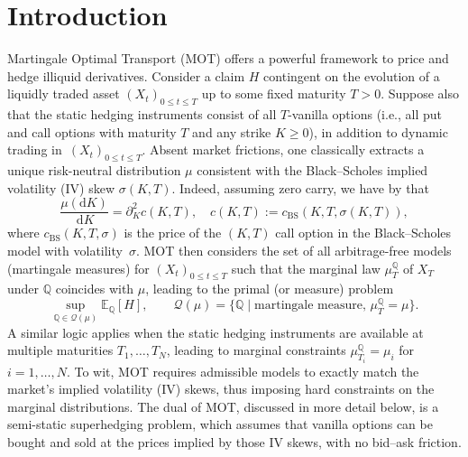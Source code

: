 \documentclass[11pt]{article}
\newcommand{\cQ}{\mathcal{Q}}
\newcommand{\Q}{\mathbb{Q}} %
\theoremstyle{plain}
\theoremstyle{definition}
\theoremstyle{remark}
\newcommand{\E}{\mathbb{E}}
\newcommand*{\rd}{\mathrm{d}}
\newcommand*{\dd}{\, \rd}
\theoremstyle{plain}
\begin{document}
%

\section{Introduction}

Martingale Optimal Transport (MOT) \cite{beiglbock2013model,galichonTouziHL,HLBook, BeiglbockJuillet2016MOT, Nutz2017Duality} offers a powerful framework to price and hedge illiquid derivatives. Consider a claim %
$H$ contingent on the evolution of a liquidly traded asset $(X_t)_{0\leq t\leq T}$ up to some fixed maturity $T>0$. 
Suppose also that the static hedging instruments consist of all $T$-vanilla options (i.e., all put and call options with maturity $T$ and any strike $K\geq0$), in addition to dynamic trading in~$(X_t)_{0\leq t\leq T}$. 
Absent market frictions, one classically extracts a unique risk-neutral distribution $\mu$ consistent with the Black--Scholes implied volatility (IV) skew $\sigma(K,T)$. Indeed, assuming zero carry, we have by \cite{breeden1978prices} that 
\begin{equation} \label{eq:BL}
    \frac{\mu(\rd K)}{\dd K} = \partial_{K}^2c(K,T), \quad c(K,T) := c_{\text{BS}}(K,T,\sigma(K,T)),
\end{equation}
where $c_{\text{BS}}(K,T,\sigma)$ is the price of the $(K,T)$ call option in the Black--Scholes model with  volatility~$\sigma$. MOT then considers the set of all arbitrage-free models (martingale measures) for $(X_t)_{0\leq t\leq T}$ such that the marginal law $\mu^{\Q}_T$ of $X_T$ under $\Q$ coincides with $\mu$, leading to the  primal (or measure) problem  
\begin{equation}\label{eq:primalMOT}
    \sup_{\Q\in \cQ(\mu)} \E_{\Q}[H], \qquad  \cQ(\mu) = \big\{\Q \mid \text{martingale measure, } \mu^{\Q}_T = \mu \big\}.
\end{equation}
A similar logic applies when the static hedging instruments are available at multiple maturities $T_1, \dots ,T_N$, leading to marginal constraints $\mu^{\Q}_{T_i} = \mu_i$ for $i=1,\dots,N$. To wit, MOT requires admissible models to exactly match the market’s implied volatility (IV) skews, thus imposing hard constraints on the marginal distributions. The dual of MOT, discussed in more detail below, is a semi-static superhedging problem,  which assumes that vanilla options can be bought and sold at the prices implied by those IV skews, with no bid--ask friction.
\end{document}
